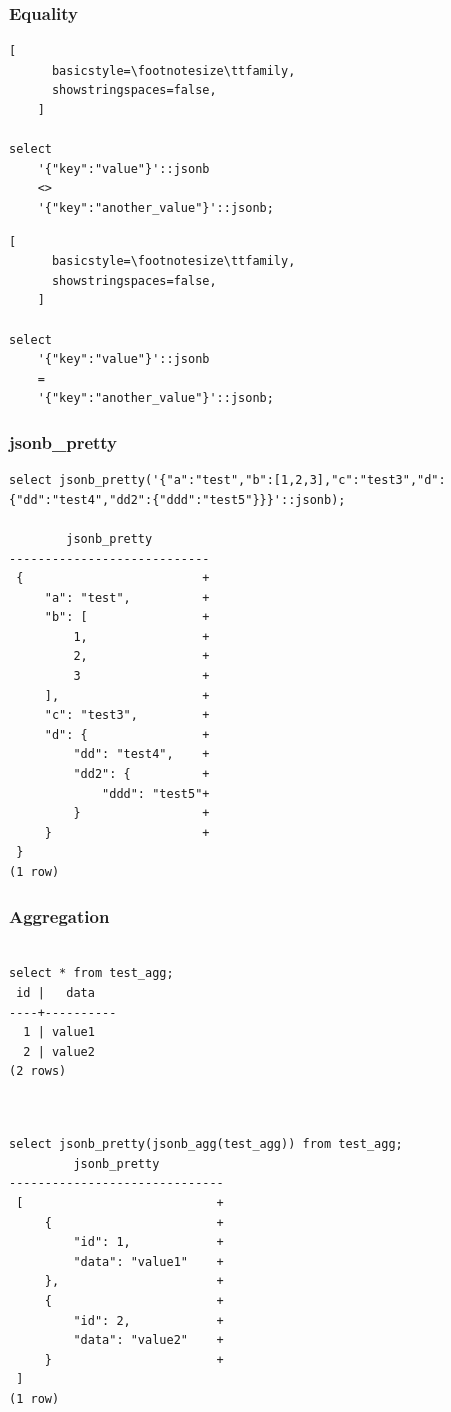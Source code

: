 \documentclass[14pt, compress, aspectratio=169]{beamer}
\begin{document}
\begin{frame}[fragile]
  \frametitle{Equality}

    \begin{lstlisting}[
      basicstyle=\footnotesize\ttfamily,
      showstringspaces=false,
    ]

select
    '{"key":"value"}'::jsonb
    <>
    '{"key":"another_value"}'::jsonb;

    \end{lstlisting}

    \begin{lstlisting}[
      basicstyle=\footnotesize\ttfamily,
      showstringspaces=false,
    ]

select
    '{"key":"value"}'::jsonb
    =
    '{"key":"another_value"}'::jsonb;

    \end{lstlisting}

\end{frame}

\begin{frame}[fragile]
  \frametitle{jsonb\_pretty}

  \begin{lstlisting}[]
select jsonb_pretty('{"a":"test","b":[1,2,3],"c":"test3","d":{"dd":"test4","dd2":{"ddd":"test5"}}}'::jsonb);

        jsonb_pretty        
----------------------------
 {                         +
     "a": "test",          +
     "b": [                +
         1,                +
         2,                +
         3                 +
     ],                    +
     "c": "test3",         +
     "d": {                +
         "dd": "test4",    +
         "dd2": {          +
             "ddd": "test5"+
         }                 +
     }                     +
 }
(1 row)
  \end{lstlisting}

\end{frame}

\begin{frame}[fragile]
  \frametitle{Aggregation}

  \vspace{-20pt}
\begin{lstlisting}[]

select * from test_agg;
 id |   data   
----+----------
  1 | value1
  2 | value2
(2 rows)
         
\end{lstlisting}

\begin{lstlisting}[]

select jsonb_pretty(jsonb_agg(test_agg)) from test_agg;
         jsonb_pretty         
------------------------------
 [                           +
     {                       +
         "id": 1,            +
         "data": "value1"    +
     },                      +
     {                       +
         "id": 2,            +
         "data": "value2"    +
     }                       +
 ]
(1 row)

\end{lstlisting}

\end{frame}
\end{document}

